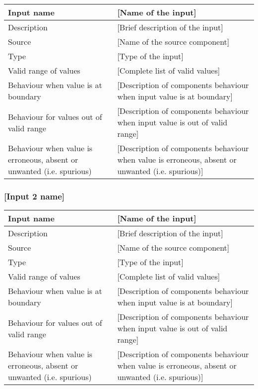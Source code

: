 \begin{longtable}{p{}p{}}
\toprule
Input name				& [Name of the input] \\
\midrule
Description				& [Brief description of the input] \\
\midrule
Source					& [Name of the source component] \\ 
\midrule
Type					& [Type of the input] \\
\midrule
Valid range of values	& [Complete list of valid values] \\
\midrule
Behaviour when value is at boundary	& [Description of components behaviour when input value is at boundary] \\
\midrule
Behaviour for values out of valid range	& [Description of components behaviour when input value is out of valid range] \\
\midrule
Behaviour when value is erroneous, absent or unwanted (i.e. spurious) & [Description of components behaviour when value is erroneous, absent or unwanted (i.e. spurious)] \\
\bottomrule
\end{longtable}


\subsubsection{[Input 2 name]}

\begin{longtable}{p{}p{}}
\toprule
Input name				& [Name of the input] \\
\midrule
Description				& [Brief description of the input] \\
\midrule
Source					& [Name of the source component] \\ 
\midrule
Type					& [Type of the input] \\
\midrule
Valid range of values	& [Complete list of valid values] \\
\midrule
Behaviour when value is at boundary	& [Description of components behaviour when input value is at boundary] \\
\midrule
Behaviour for values out of valid range	& [Description of components behaviour when input value is out of valid range] \\
\midrule
Behaviour when value is erroneous, absent or unwanted (i.e. spurious) & [Description of components behaviour when value is erroneous, absent or unwanted (i.e. spurious)] \\
\bottomrule
\end{longtable}


